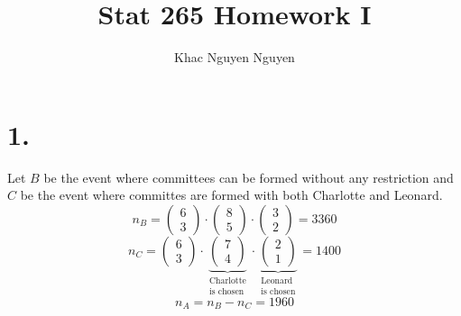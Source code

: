 \documentclass[11pt]{article}
\title{\textbf{Stat 265 Homework I}}
\author{Khac Nguyen Nguyen}
\date{}
\begin{document}
	



\section*{1.}
Let $B$ be the event where committees can be formed without any restriction and $C$ be the event where committes are formed with both Charlotte and Leonard.
\[
n_B = 
\begin{pmatrix}
6 \\
3
\end{pmatrix}
\cdot
\begin{pmatrix}
8 \\
5
\end{pmatrix}
\cdot
\begin{pmatrix}
3 \\
2
\end{pmatrix}
= 3360
\]
\[n_C =
\begin{pmatrix}
6 \\
3
\end{pmatrix}
\cdot
\underbrace{
\begin{pmatrix}
7 \\
4
\end{pmatrix}
}_{\substack{{\text{Charlotte}} \\ \text{is chosen}}}
\cdot
\underbrace{
\begin{pmatrix}
2 \\
1
\end{pmatrix}
}_{\substack{{\text{Leonard}} \\ \text{is chosen}}}
=1400
\]
\[
n_A = n_B - n_C = 1960
\]
\pagebreak
\end{document}

